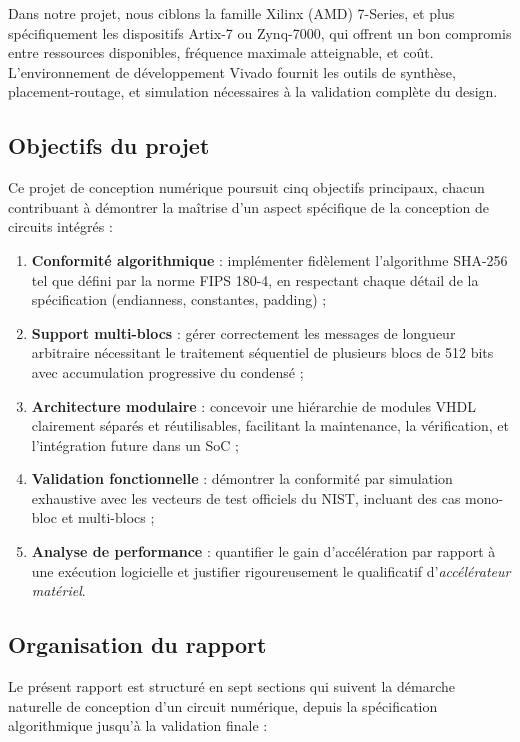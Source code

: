 Dans notre projet, nous ciblons la famille Xilinx (AMD) 7-Series, et plus spécifiquement les dispositifs Artix-7 ou Zynq-7000, qui offrent un bon compromis entre ressources disponibles, fréquence maximale atteignable, et coût. L'environnement de développement Vivado fournit les outils de synthèse, placement-routage, et simulation nécessaires à la validation complète du design.

\subsection{Objectifs du projet}

Ce projet de conception numérique poursuit cinq objectifs principaux, chacun contribuant à démontrer la maîtrise d'un aspect spécifique de la conception de circuits intégrés :

\begin{enumerate}
    \item \textbf{Conformité algorithmique} : implémenter fidèlement l'algorithme SHA-256 tel que défini par la norme FIPS 180-4, en respectant chaque détail de la spécification (endianness, constantes, padding) ;
    \item \textbf{Support multi-blocs} : gérer correctement les messages de longueur arbitraire nécessitant le traitement séquentiel de plusieurs blocs de 512 bits avec accumulation progressive du condensé ;
    \item \textbf{Architecture modulaire} : concevoir une hiérarchie de modules VHDL clairement séparés et réutilisables, facilitant la maintenance, la vérification, et l'intégration future dans un SoC ;
    \item \textbf{Validation fonctionnelle} : démontrer la conformité par simulation exhaustive avec les vecteurs de test officiels du NIST, incluant des cas mono-bloc et multi-blocs ;
    \item \textbf{Analyse de performance} : quantifier le gain d'accélération par rapport à une exécution logicielle et justifier rigoureusement le qualificatif d'\emph{accélérateur matériel}.
\end{enumerate}

\subsection{Organisation du rapport}

Le présent rapport est structuré en sept sections qui suivent la démarche naturelle de conception d'un circuit numérique, depuis la spécification algorithmique jusqu'à la validation finale :

